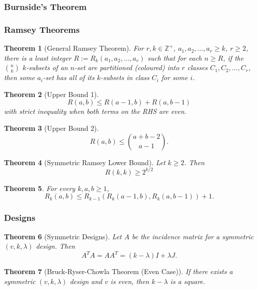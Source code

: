 \documentclass[12]{article}
\newcommand{\Z}{\mathbb{Z}}
\newtheorem{thm}{Theorem}[section] %
\theoremstyle{definition}
\begin{document}
	\subsubsection{Burnside's Theorem}
	
	\subsubsection{Ramsey Theorems}
	
	\begin{thm}[General Ramsey Theorem]
		For $r, k \in \Z^+$, $a_1, a_2, \ldots, a_r \geq k$, $r \geq 2$, there is a least integer $R := R_k(a_1, a_2, \ldots, a_r)$ such that for each $n \geq R$, if the ${n \choose k}$ $k$-subsets of an $n$-set are partitioned (coloured) into $r$ classes $C_1, C_2, \ldots, C_r$, then some $a_i$-set has all of its $k$-subsets in class $C_i$ for some $i$.
	\end{thm}
	
	\begin{thm}[Upper Bound 1]
		$$R(a,b) \leq R(a-1,b) + R(a,b-1)$$
		with strict inequality when both terms on the RHS are even.
	\end{thm}

	\begin{thm}[Upper Bound 2]
		$$R(a,b) \leq {a + b - 2 \choose a-1}.$$
	\end{thm}

	\begin{thm}[Symmetric Ramsey Lower Bound]
		Let $k \geq 2$.  Then
		$$R(k,k) \geq 2^{k/2}$$
	\end{thm}

	\begin{thm}
		For every $k,a,b \geq 1$,
		$$R_k(a,b) \leq R_{k-1}(R_k(a-1,b), R_k(a,b-1))+1.$$
	\end{thm}

	\subsubsection{Designs}
	
	\begin{thm}[Symmetric Designs]
		Let $A$ be the incidence matrix for a symmetric $(v,k,\lambda)$ design.  Then
		$$A^TA = AA^T = (k-\lambda)I + \lambda J.$$
	\end{thm}

	\begin{thm}[Bruck-Ryser-Chowla Theorem (Even Case)]
		If there exists a symmetric $(v,k,\lambda)$ design and $v$ is even, then $k-\lambda$ is a square.
	\end{thm}
\end{document}
